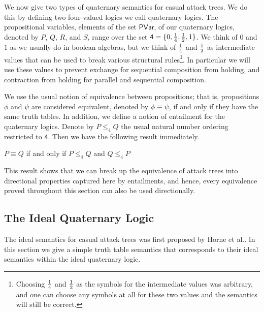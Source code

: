 \documentclass{llncs}
\begin{document}
 We now give two types of quaternary semantics for casual attack
 trees.  We do this by defining two four-valued logics we call
 quaternary logics.  The propositional variables, elements of the set
 $\mathsf{PVar}$, of our quaternary logics, denoted by $P$, $Q$, $R$,
 and $S$, range over the set $\mathsf{4} = \{0, \frac{1}{4}, \frac{1}{2}, 1\}$.
 We think of $0$ and $1$ as we usually do in boolean algebras, but we
 think of $\frac{1}{4}$ and $\frac{1}{2}$ as intermediate values that can be used
 to break various structural rules\footnote{Choosing $\frac{1}{4}$ and
   $\frac{1}{2}$ as the symbols for the intermediate values was arbitrary,
   and one can choose any symbols at all for these two values and the
   semantics will still be correct.}.  In particular we will use these
 values to prevent exchange for sequential composition from holding,
 and contraction from holding for parallel and sequential composition.

We use the usual notion of equivalence between propositions; that is,
propositions $\phi$ and $\psi$ are considered equivalent, denoted by
$\phi \equiv \psi$, if and only if they have the same truth tables.
In addition, we define a notion of entailment for the quaternary
logics.  Denote by $P \leq_4 Q$ the usual natural number ordering
restricted to $\mathsf{4}$.  Then we have the following result
immediately.
\begin{lemma}
  \label{lemma:entailment_in_the_quaternary_semantics}
  $P \equiv Q$ if and only if $P \leq_4 Q$ and $Q \leq_4 P$
\end{lemma}
This result shows that we can break up the equivalence of attack trees
into directional properties captured here by entailments, and hence,
every equivalence proved throughout this section can also be used
directionally.

\subsection{The Ideal Quaternary Logic}
\label{subsec:the_ideal_quaternary_semantics}
The ideal semantics for casual attack trees was first proposed by
Horne et al.\cite{horne2017semantics}.  In this section we give a
simple truth table semantics that corresponds to their ideal semantics
within the ideal quaternary logic.
\end{document}
